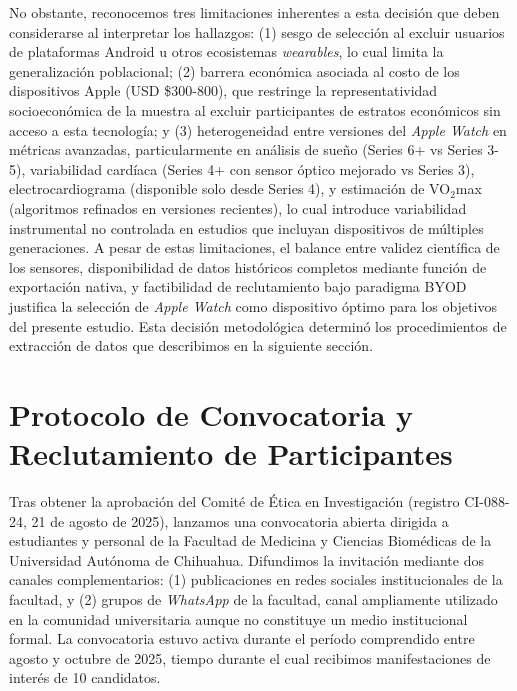 No obstante, reconocemos tres limitaciones inherentes a esta decisión que deben considerarse al interpretar los hallazgos: (1) sesgo de selección al excluir usuarios de plataformas Android u otros ecosistemas \textit{wearables}, lo cual limita la generalización poblacional; (2) barrera económica asociada al costo de los dispositivos Apple (USD \$300-800), que restringe la representatividad socioeconómica de la muestra al excluir participantes de estratos económicos sin acceso a esta tecnología; y (3) heterogeneidad entre versiones del \textit{Apple Watch} en métricas avanzadas, particularmente en análisis de sueño (Series 6+ vs Series 3-5), variabilidad cardíaca (Series 4+ con sensor óptico mejorado vs Series 3), electrocardiograma (disponible solo desde Series 4), y estimación de VO$_2$max (algoritmos refinados en versiones recientes), lo cual introduce variabilidad instrumental no controlada en estudios que incluyan dispositivos de múltiples generaciones. A pesar de estas limitaciones, el balance entre validez científica de los sensores, disponibilidad de datos históricos completos mediante función de exportación nativa, y factibilidad de reclutamiento bajo paradigma BYOD justifica la selección de \textit{Apple Watch} como dispositivo óptimo para los objetivos del presente estudio. Esta decisión metodológica determinó los procedimientos de extracción de datos que describimos en la siguiente sección.

\section{Protocolo de Convocatoria y Reclutamiento de Participantes}
\label{sec:convocatoria}

Tras obtener la aprobación del Comité de Ética en Investigación (registro CI-088-24, 21 de agosto de 2025), lanzamos una convocatoria abierta dirigida a estudiantes y personal de la Facultad de Medicina y Ciencias Biomédicas de la Universidad Autónoma de Chihuahua. Difundimos la invitación mediante dos canales complementarios: (1) publicaciones en redes sociales institucionales de la facultad, y (2) grupos de \textit{WhatsApp} de la facultad, canal ampliamente utilizado en la comunidad universitaria aunque no constituye un medio institucional formal. La convocatoria estuvo activa durante el período comprendido entre agosto y octubre de 2025, tiempo durante el cual recibimos manifestaciones de interés de 10 candidatos.

